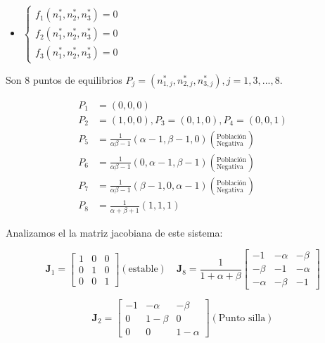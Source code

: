 \documentclass[twocolumn,aps,prl]{revtex4-1}
\newcommand{\nstar}{n^*}
\begin{document}
\begin{itemize}\centering
    \item[] 
    $\left\lbrace
    \begin{aligned}
        f_1(\nstar_1,\nstar_2,\nstar_3) = 0\\ 
        f_2(\nstar_1,\nstar_2,\nstar_3) = 0\\ 
        f_3(\nstar_1,\nstar_2,\nstar_3) = 0   
    \end{aligned}\right.
    $
\end{itemize}


Son 8 puntos de equilibrios $P_j = (\nstar_{1,j},\nstar_{2,j},\nstar_{3,j}), j= 1, 3, ..., 8$.

$$
\begin{aligned}
    P_1 &= (0, 0, 0) \\ 
    P_2 &= (1, 0, 0), P_3 = (0, 1, 0), P_4 = (0, 0, 1) \\
    P_5 &= \frac{1}{\alpha \beta - 1} 
                       (\alpha - 1, \beta - 1 , 0)  \left(^\text{Población}_\text{Negativa} \right)  \\ 
    P_6 &= \frac{1}{\alpha \beta - 1} 
                       (0         , \alpha - 1, \beta - 1)  \left(^\text{Población}_\text{Negativa} \right)  \\ 
    P_7 &= \frac{1}{\alpha \beta - 1} 
                       (\beta - 1 , 0         , \alpha - 1)  \left(^\text{Población}_\text{Negativa} \right)  \\ 
    P_8 &= \frac{1}{\alpha + \beta + 1}(1, 1, 1) 
\end{aligned}
$$

Analizamos el la matriz jacobiana de este sistema:

$$
\mathbf{J}_1 = 
\begin{bmatrix}
    1  & 0 & 0 \\
    0 & 1 & 0 \\
    0 & 0 & 1
\end{bmatrix} (\text{estable})
\quad 
\mathbf{J}_8 = 
\frac{1}{1+\alpha+\beta}\begin{bmatrix}
    -1 & -\alpha & -\beta \\
    -\beta & -1 & -\alpha \\
    -\alpha & -\beta & -1
\end{bmatrix}
$$

$$
\mathbf{J}_2 = 
\begin{bmatrix}
    -1 & - \alpha & - \beta \\
    0 & 1-\beta & 0 \\
    0 & 0 & 1- \alpha
\end{bmatrix} (\text{Punto silla})
$$
\end{document}
